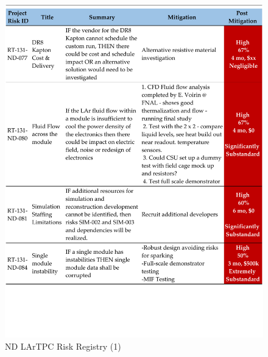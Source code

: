 \begin{figure}
\centering 
\includegraphics[width=1\linewidth]{graphics/lartpc/lartpcrisk1.pdf}
\caption{\label{fig:lartpcrisk1} ND LArTPC Risk Registry (1)}
\end{figure}
